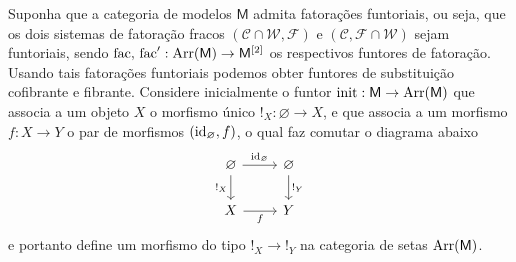 \begin{obs}
  \label{obs:substituicao_cofibrante_fibrante_funtorial}
  Suponha que a categoria de modelos $\mathsf{M}$ admita fatorações funtoriais, ou seja, que os dois sistemas de fatoração fracos $(\mathcal{C} \cap \mathcal{W},\mathcal{F})$ e $(\mathcal{C},\mathcal{F} \cap \mathcal{W})$ sejam funtoriais, sendo $\mathrm{fac},\, \mathrm{fac}': \mathrm{Arr}(\mathsf{M}) \to \mathsf{M}^{[2]}$ os respectivos funtores de fatoração.
  Usando tais fatorações funtoriais podemos obter funtores de substituição cofibrante e fibrante.
  Considere inicialmente o funtor $\mathrm{init}: \mathsf{M} \to \mathrm{Arr}(\mathsf{M})$ que associa a um objeto $X$ o morfismo único $!_{X}: \varnothing \to X$, e que associa a um morfismo $f: X \to Y$ o par de morfismos $(\mathrm{id}_{\varnothing},f)$, o qual faz comutar o diagrama abaixo
  \begin{displaymath}
    \begin{tikzcd}
      \varnothing
      \arrow[d, "!_{X}" swap]
      \arrow[r, "\id_{\varnothing}"]
      & \varnothing
      \arrow[d, "!_{Y}"]
      \\ X
      \arrow[r, "f" swap]
      & Y
    \end{tikzcd}
  \end{displaymath}
  e portanto define um morfismo do tipo $!_{X} \to !_{Y}$ na categoria de setas $\mathrm{Arr}(\mathsf{M})$.


\end{obs}
